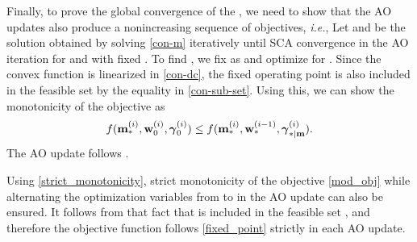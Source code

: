 Finally, to prove the global convergence of the , we need to show that the \ac{AO} updates also produce a nonincreasing sequence of objectives, \textit{i.e.}, 
\iftoggle{single_column}{
\begin{equation}
f(\iter{\mx}{\lpoint}{i},\iter{\my}{0}{i},\iter{\mz}{0}{i}) \leq f(\iter{\mx}{\lpoint}{i},\iter{\my}{\lpoint}{i-1},\iter{\mz}{\lpoint|\my}{i}).
\end{equation}}{
\begin{equation}
f(\iter{\mx}{\lpoint}{i},\iter{\my}{0}{i},\iter{\mz}{0}{i}) \leq f(\iter{\mx}{\lpoint}{i},\iter{\my}{\lpoint}{i-1},\iter{\mz}{\lpoint|\my}{i}).
\end{equation}}
Let  and  be the solution obtained by solving \eqref{con-m} iteratively until \ac{SCA} convergence in the  \ac{AO} iteration for \eqn{\mx} and \eqn{\mz} with fixed . To find , we fix \eqn{\mx} as  and optimize for \me{\my}. Since the convex function is linearized in \eqref{con-dc}, the fixed operating point is also included in the feasible set  by the equality in \eqref{con-sub-set}. Using this, we can show the monotonicity of the objective as
\begin{equation} \label{fixed_point}
f(\iter{\mx}{\lpoint}{i},\iter{\my}{0}{i},\iter{\mz}{0}{i}) \leq f(\iter{\mx}{\lpoint}{i},\iter{\my}{\lpoint}{i-1},\iter{\mz}{\lpoint|\mx}{i}).
\end{equation}
The \ac{AO} update follows .

Using \eqref{strict_monotonicity}, strict monotonicity of the objective \eqref{mod_obj} while alternating the optimization variables from \eqn{\mx,\mz} to \eqn{\my,\mz} in the  \ac{AO} update can also be ensured. It follows from that fact that  is included in the feasible set , and therefore the objective function follows \eqref{fixed_point} strictly in each \ac{AO} update.


